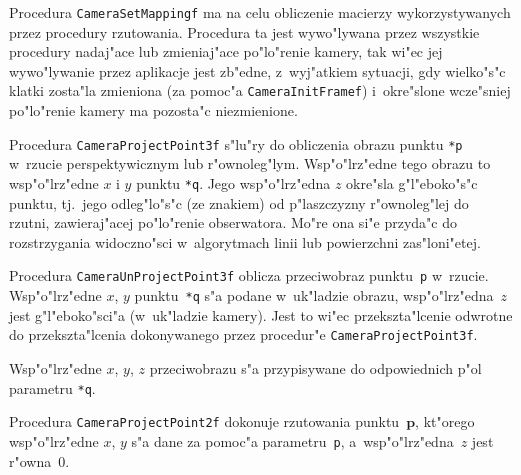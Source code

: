 \vspace{\bigskipamount}
Procedura \texttt{CameraSetMappingf} ma na celu obliczenie macierzy
wykorzystywanych przez procedury rzutowania. Procedura ta jest wywo"lywana
przez wszystkie procedury nadaj"ace lub zmieniaj"ace po"lo"renie kamery, tak
wi"ec jej wywo"lywanie przez aplikacje jest zb"edne, z~wyj"atkiem sytuacji,
gdy wielko"s"c klatki zosta"la zmieniona (za pomoc"a
\texttt{CameraInitFramef}) i~okre"slone wcze"sniej po"lo"renie kamery
ma pozosta"c niezmienione.

\vspace{\bigskipamount}
Procedura \texttt{CameraProjectPoint3f} s"lu"ry do obliczenia obrazu punktu
\texttt{*p} w~rzucie perspektywicznym lub r"ownoleg"lym.
Wsp"o"lrz"edne tego obrazu to wsp"o"lrz"edne $x$ i $y$ punktu \texttt{*q}.
Jego wsp"o"lrz"edna $z$ okre"sla g"l"eboko"s"c punktu, tj.\ jego odleg"lo"s"c
(ze znakiem) od p"laszczyzny r"ownoleg"lej do rzutni, zawieraj"acej
po"lo"renie obserwatora. Mo"re ona si"e przyda"c do rozstrzygania
widoczno"sci w~algorytmach linii lub powierzchni zas"loni"etej.

\vspace{\bigskipamount}
Procedura \texttt{CameraUnProjectPoint3f} oblicza przeciwobraz
punktu~\texttt{p} w~rzucie. Wsp"o"lrz"edne $x$, $y$ punktu~\texttt{*q}
s"a podane w~uk"ladzie obrazu, wsp"o"lrz"edna~$z$ jest g"l"eboko"sci"a
(w~uk"ladzie kamery). Jest to wi"ec przekszta"lcenie odwrotne do
przekszta"lcenia dokonywanego przez procedur"e
\texttt{CameraProjectPoint3f}.

Wsp"o"lrz"edne $x$, $y$, $z$ przeciwobrazu s"a przypisywane do odpowiednich
p"ol parametru \texttt{*q}.

\vspace{\bigskipamount}
\begin{sloppypar}
Procedura \texttt{CameraProjectPoint2f} dokonuje rzutowania
punktu~$\bm{p}$, kt"orego wsp"o"lrz"edne $x$, $y$ s"a dane za pomoc"a
parametru~\texttt{p}, a~wsp"o"lrz"edna~$z$ jest r"owna~$0$.%
\end{sloppypar}

